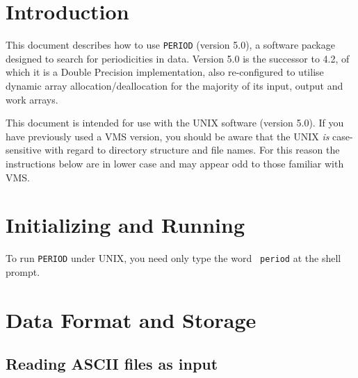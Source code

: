  \begin{latexonly}
   \setlength{\parskip}{0mm}
   \latexonlytoc
   \setlength{\parskip}{\medskipamount}
   \markboth{\stardocname}{\stardocname}
 \end{latexonly}
\newpage
\renewcommand{\thepage}{\arabic{page}}

\section{Introduction}

This document describes how to use {\tt PERIOD} (version 5.0), a
software package designed to search for periodicities in data.
Version 5.0 is the successor to 4.2, of which
it is a Double Precision implementation, also re-configured to utilise
dynamic array allocation/deallocation for the majority of its input,
output and work arrays.

This document is intended for use with the UNIX software (version
5.0). If you have previously used a VMS version, you should be aware
that the UNIX {\em is} case-sensitive with regard to directory
structure and file names.  For this reason the instructions below are
in lower case and may appear odd to those familiar with VMS.

\section{Initializing and Running}

To run {\tt PERIOD} under UNIX, you need only type the word {\tt
period} at the shell prompt.

\section{Data Format and Storage}
\label{slots}

\subsection{Reading ASCII files as input}
\label{slots1}

